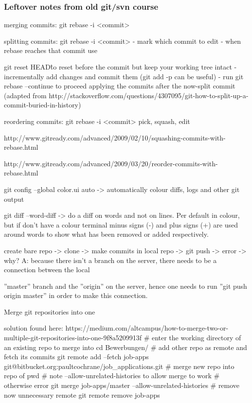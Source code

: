 \documentclass{git_course}
\begin{document}
\begin{frame}
\frametitle{Leftover notes from old git/svn course}
merging commits: git rebase -i <commit>

splitting commits: git rebase -i <commit> - mark which commit
to edit - when rebase reaches that commit use

git reset HEAD\^ to reset before the commit but keep your
working tree intact - incrementally add changes and commit
them (git add -p can be useful) - run git rebase –continue to
proceed applying the commits after the now-split commit
(adapted from
http://stackoverflow.com/questions/4307095/git-how-to-split-up-a-commit-buried-in-history)

reordering commits: git rebase -i <commit>
pick, squash, edit

http://www.gitready.com/advanced/2009/02/10/squashing-commits-with-rebase.html

http://www.gitready.com/advanced/2009/03/20/reorder-commits-with-rebase.html

git config --global color.ui auto -> automatically colour diffs,
logs and other git output

git diff --word-diff -> do a diff on words and not on lines. Per
default in colour, but if don’t have a colour terminal minus
signs (-) and plus signs (+) are used around words to show
what has been removed or added respectively.

create bare repo -> clone -> make commits in local repo -> git
push -> error -> why? A: because there isn’t a branch on the
server, there needs to be a connection between the local

”master” branch and the ”origin” on the server, hence one
needs to run ”git push origin master” in order to make this
connection.
\end{frame}




\begin{frame}{Merge git repositories into one}

solution found here: https://medium.com/altcampus/how-to-merge-two-or-multiple-git-repositories-into-one-9f8a5209913f
# enter the working directory of an existing repo to merge into
cd Bewerbungen/
# add other repo as remote and fetch its commits
git remote add --fetch job-apps git@bitbucket.org:paultcochrane/job_applications.git
# merge new repo into repo of pwd
# note --allow-unrelated-histories to allow merge to work
# otherwise error
git merge job-apps/master --allow-unrelated-histories
# remove now unnecessary remote
git remote remove job-apps

\end{frame}
\end{document}
